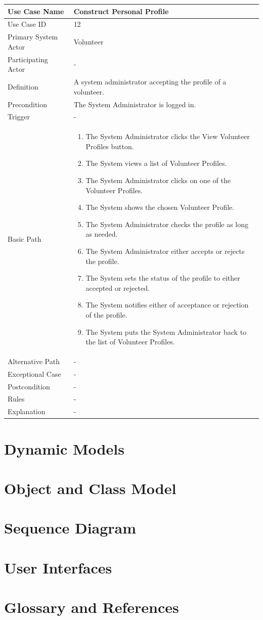\documentclass[a4paper,12pt]{report}
\begin{document}
		\begin{tabular}{|m{4cm}|m{11.5cm}|}
			\hline
				Use Case Name & Construct Personal Profile\\
			\hline
				Use Case ID & 12\\
			\hline
				Primary System Actor & Volunteer\\
			\hline
				Participating Actor & -\\
			\hline
				Definition & A system administrator accepting the profile of a volunteer.\\
			\hline
				Precondition & The System Administrator is logged in.\\
			\hline
				Trigger & -\\
			\hline
				Basic Path & \begin{enumerate}
					\item The System Administrator clicks the View Volunteer Profiles button.
					\item The System views a list of Volunteer Profiles.
					\item The System Administrator clicks on one of the Volunteer Profiles.
					\item The System shows the chosen Volunteer Profile.
					\item The System Administrator checks the profile as long as needed.
					\item The System Administrator either accepts or rejects the profile.
					\item The System sets the status of the profile to either accepted or rejected.
					\item The System notifies either of acceptance or rejection of the profile.
					\item The System puts the System Administrator back to the list of Volunteer Profiles.
				\end{enumerate}		
				\\
			\hline
				Alternative Path & -\\
			\hline
				Exceptional Case & -\\
			\hline
				Postcondition & -\\
			\hline
				Rules & -\\
			\hline
				Explanation & -\\
			\hline
		\end{tabular}
	\section{Dynamic Models}
	\section{Object and Class Model}
	\section{Sequence Diagram}
	\section{User Interfaces}
	\section{Glossary and References}
\end{document}
